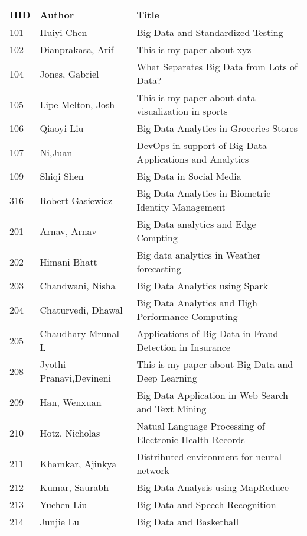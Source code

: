 \documentclass[12pt]{book}
\begin{document}
\begin{footnotesize}
\begin{longtable}{|p{1cm}p{5cm}p{9cm}|}
\hline \textbf{HID} & \textbf{Author} & \textbf{Title} \\ \hline \hline

101 & Huiyi Chen & Big Data and Standardized Testing  \\
\hline
102 & Dianprakasa, Arif & This is my paper about xyz  \\
\hline
104 & Jones, Gabriel & What Separates Big Data from Lots of Data?  \\
\hline
105 & Lipe-Melton, Josh & This is my paper about data visualization in sports  \\
\hline
106 & Qiaoyi Liu & Big Data Analytics in Groceries Stores  \\
\hline
107 & Ni,Juan & DevOps in support of Big Data Applications and Analytics  \\
\hline
109 & Shiqi Shen & Big Data in Social Media  \\
\hline
316 & Robert Gasiewicz & Big Data Analytics in Biometric Identity Management  \\
\hline
201 & Arnav, Arnav & Big Data analytics and Edge Compting  \\
\hline
202 & Himani Bhatt & Big data analytics in Weather forecasting  \\
\hline
203 & Chandwani, Nisha & Big Data Analytics using Spark  \\
\hline
204 & Chaturvedi, Dhawal & Big Data Analytics and High Performance Computing  \\
\hline
205 & Chaudhary Mrunal L & Applications of Big Data in Fraud Detection in Insurance  \\
\hline
208 & Jyothi Pranavi,Devineni & This is my paper about Big Data and Deep Learning  \\
\hline
209 & Han, Wenxuan & Big Data Application in Web Search and Text Mining  \\
\hline
210 & Hotz, Nicholas & Natual Language Processing of Electronic Health Records  \\
\hline
211 & Khamkar, Ajinkya & Distributed environment for neural network  \\
\hline
212 & Kumar, Saurabh & Big Data Analysis using MapReduce  \\
\hline
213 & Yuchen Liu & Big Data and Speech Recognition  \\
\hline
214 & Junjie Lu & Big Data and Basketball  \\
\hline

\end{longtable}
\end{footnotesize}
\end{document}
